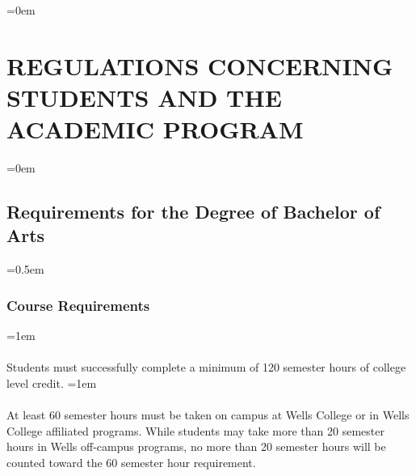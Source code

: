\documentclass{manual}
\let\stdsection\section %
\renewcommand\section{\newpage\stdsection}
\let\oldsection\section
\renewcommand\section{\leftskip=0em\oldsection}
\let\oldsubsection\subsection
\renewcommand\subsection{\leftskip=0em\oldsubsection}
\let\oldsubsubsection\subsubsection
\renewcommand\subsubsection{\leftskip=0.5em\oldsubsubsection}
\let\oldparagraph\paragraph
\renewcommand\paragraph{\leftskip=1em\oldparagraph}
\begin{document}






















































\section{REGULATIONS CONCERNING STUDENTS AND THE ACADEMIC PROGRAM}\label{art:RegulationsConcerningStudentStatus}

\subsection{Requirements for the Degree of Bachelor of Arts}

\subsubsection{Course Requirements}

\paragraph{} Students must successfully complete a minimum of 120 semester hours of college level credit.
\paragraph{} At least 60 semester hours must be taken on campus at Wells College or in Wells College affiliated programs. While students may take more than 20 semester hours in Wells off-campus programs, no more than 20 semester hours will be counted toward the 60 semester hour requirement.
\end{document}
